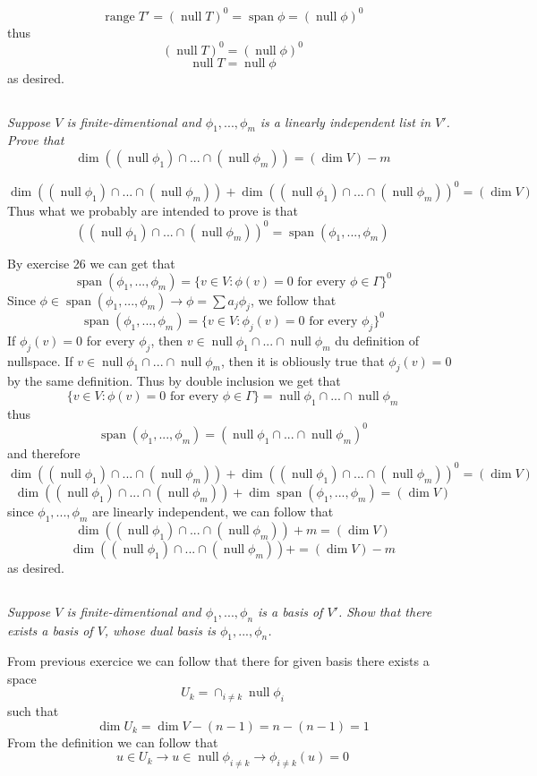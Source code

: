 \documentclass[11pt,oneside,titlepage]{book}
\DeclareMathOperator \ns {null}
\DeclareMathOperator \range {range}
\DeclareMathOperator \Span {span}
\begin{document}
$$\range T' = (\ns T)^0 = \Span \phi = (\ns \phi)^0$$
thus
$$(\ns T)^0 = (\ns \phi)^0$$
$$\ns T = \ns \phi$$
as desired.

\subsection{}

\textit{Suppose $V$ is finite-dimentional and $\phi_1, ..., \phi_m$ is a linearly independent
  list in $V'$. Prove that }
$$\dim ((\ns \phi_1) \cap ... \cap (\ns \phi_m)) = (\dim V) - m$$


$$\dim ((\ns \phi_1) \cap ... \cap (\ns \phi_m)) +
\dim ((\ns \phi_1) \cap ... \cap (\ns \phi_m))^0= (\dim V) $$
Thus what we probably are intended to prove is that
$$((\ns \phi_1) \cap ... \cap (\ns \phi_m))^0 = \Span(\phi_1, ..., \phi_m)$$

By exercise 26 we can get that
$$\Span(\phi_1, ..., \phi_m) = \{v \in V: \phi(v) = 0 \text{ for every } \phi \in \Gamma\}^0$$
Since $\phi \in \Span(\phi_1, ..., \phi_m) \to \phi = \sum a_j \phi_j$, we follow that
$$\Span(\phi_1, ..., \phi_m) = \{v \in V: \phi_j(v) = 0 \text{ for every } \phi_j\}^0$$
If $\phi_j(v) = 0$ for every $\phi_j$, then $v \in \ns \phi_1 \cap ... \cap \ns \phi_m$
du definition of nullspace. If $v \in \ns \phi_1 \cap ... \cap \ns \phi_m$, then it is
obliously true that $\phi_j(v)  = 0$ by the same definition. Thus by double inclusion we get
that
$$\{v \in V: \phi(v) = 0 \text{ for every } \phi \in \Gamma\} =
\ns \phi_1 \cap ... \cap \ns \phi_m$$
thus 
$$\Span(\phi_1, ..., \phi_m) = (\ns \phi_1 \cap ... \cap \ns \phi_m)^0$$
and therefore
$$\dim ((\ns \phi_1) \cap ... \cap (\ns \phi_m)) +
\dim ((\ns \phi_1) \cap ... \cap (\ns \phi_m))^0= (\dim V) $$
$$\dim ((\ns \phi_1) \cap ... \cap (\ns \phi_m)) +
\dim \Span(\phi_1, ..., \phi_m) = (\dim V) $$
since $\phi_1, ..., \phi_m$ are linearly independent, we can follow that
$$\dim ((\ns \phi_1) \cap ... \cap (\ns \phi_m)) +
m = (\dim V) $$
$$\dim ((\ns \phi_1) \cap ... \cap (\ns \phi_m)) +
= (\dim V) - m$$
as desired.

\subsection{}

\textit{Suppose $V$ is finite-dimentional and $\phi_1, ..., \phi_n$ is a basis of $V'$.
  Show that there exists a basis of $V$, whose dual basis is $\phi_1, ..., \phi_n$.}

From previous exercice we can follow that there for given basis there exists a space
$$U_k = \cap_{i \neq k} {\ns \phi_i}$$
such that
$$\dim U_k = \dim V - (n - 1) = n - (n - 1) = 1$$
From the definition we can follow that
$$u \in U_k \to u \in \ns \phi_{i \neq k} \to  \phi_{i \neq k}(u) = 0$$
\end{document}
